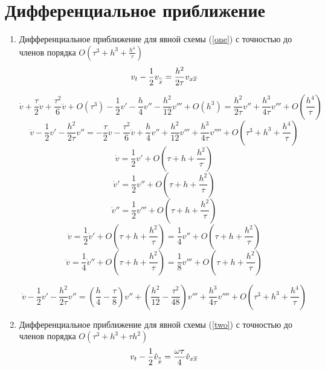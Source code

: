 \section{Дифференциальное приближение}
\begin{enumerate}
\item Дифференциальное приближение для явной схемы  (\ref{one}) с точностью до членов порядка $O\left(\tau^3+ h^3 +\frac{h^4}{\tau}\right) $
\[
v_t - \frac{1}{2} v_{ \overset{\circ}{x} } = \frac{h^2}{2\tau} v_{x \overline{x}}
\]


\[
\dot v + \frac{\tau}{2} \ddot v  + \frac{\tau^2}{6} \dddot v + O\left(\tau^3\right) - \frac{1}{2} v' -  \frac{h}{4}v'' - \frac{h^2}{12} v''' + O\left(h^3\right) = 
\frac{h^2}{2\tau} v'' + \frac{h^3}{4\tau} v''' + O\left(\frac{h^4}{\tau}\right) 
\]
\[
\dot v - \frac{1}{2} v' - \frac{h^2}{2\tau} v'' = - \frac{\tau}{2} \ddot v  - \frac{\tau^2}{6} \dddot v  +  \frac{h}{4}v'' + \frac{h^2}{12} v''' 
 + \frac{h^3}{4\tau} v'''' + O\left(\tau^3+ h^3 +\frac{h^4}{\tau}\right) 
\]
\[
\dot v = \frac{1}{2} v' + O\left(\tau + h + \frac{h^2}{\tau}\right)
\]
\[
\dot v' = \frac{1}{2} v'' + O\left(\tau + h + \frac{h^2}{\tau}\right)
\]
\[
\dot v'' = \frac{1}{2} v''' + O\left(\tau + h + \frac{h^2}{\tau}\right)
\]
\[
\ddot v = \frac{1}{2} \dot v' + O\left(\tau + h + \frac{h^2}{\tau}\right) = \frac{1}{4} v'' +  O\left(\tau + h + \frac{h^2}{\tau}\right) 
\]
\[
\dddot v = \frac{1}{4} \dot v'' + O\left(\tau + h + \frac{h^2}{\tau}\right) = \frac{1}{8} v''' +  O\left(\tau + h + \frac{h^2}{\tau}\right) 
\]


\[
\dot v - \frac{1}{2} v' - \frac{h^2}{2\tau} v'' = \left(\frac{h}{4} - \frac{\tau}{8} \right) v''  + \left(\frac{h^2}{12}  - \frac{\tau^2}{48} \right)  v'''   + \frac{h^3}{4\tau} v'''' + O\left(\tau^3+ h^3 +\frac{h^4}{\tau}\right) 
\]

\newpage
\item Дифференциальное приближение для явной схемы  (\ref{two}) с точностью до членов порядка $O\left(\tau^3 +h^3 + \tau h^2\right)$
\[
v_t - \frac{1}{2}\hat{v}_{ \overset{\circ}{x} } = \frac{\omega \tau}{4} \hat{v}_{x \overline{x}}
\]



\end{enumerate}
